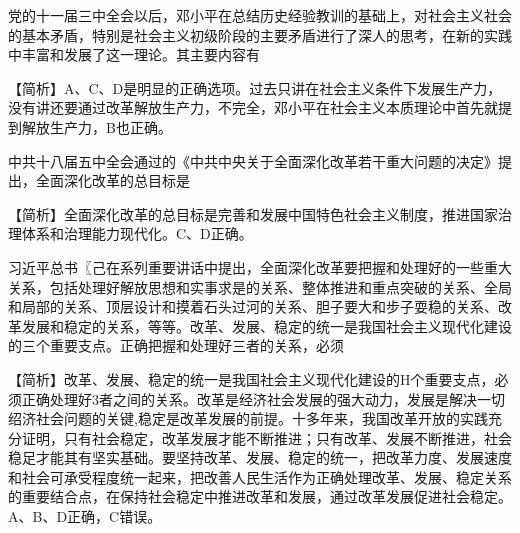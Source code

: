 \question 党的十一届三中全会以后，邓小平在总结历史经验教训的基础上，对社会主义社会的基本矛盾，特别是社会主义初级阶段的主要矛盾进行了深人的思考，在新的实践中丰富和发展了这一理论。其主要内容有
\par\fourch{\textcolor{red}{判断一种生产关系和生产力是否相适应，主要希它是否适应当时当地生产力的耍求，能否推动生产力发展}}{\textcolor{red}{提出在社会主义社会依然有解放生产力的问题}}{\textcolor{red}{社会主义社会基本矛盾、主要矛盾和根本任务是统一的，它们要求必须把经济建设作为党和国家的工作重心，不断解放和发展生产力}}{\textcolor{red}{改革是社会主义制度下解放和发展生产力的必由之路}}
\begin{solution}【简析】A、C、D是明显的正确选项。过去只讲在社会主义条件下发展生产力，没有讲还要通过改革解放生产力，不完全，邓小平在社会主义本质理论中首先就提到解放生产力，B也正确。
\end{solution}
\question 中共十八届五中全会通过的《中共中央关于全面深化改革若干重大问题的决定》提出，全面深化改革的总目标是
\par{}
\begin{solution}【简析】全面深化改革的总目标是完善和发展中国特色社会主义制度，推进国家治理体系和治理能力现代化。C、D正确。
\end{solution}
\question 习近平总书〖己在系列重要讲话中提出，全面深化改革要把握和处理好的一些重大关系，包括处理好解放思想和实事求是的关系、整体推进和重点突破的关系、全局和局部的关系、顶层设计和摸着石头过河的关系、胆子要大和步子耍稳的关系、改革发展和稳定的关系，等等。改革、发展、稳定的统一是我国社会主义现代化建设的三个重要支点。正确把握和处理好三者的关系，必须
\par{}
\begin{solution}【简析】改革、发展、稳定的统一是我国社会主义现代化建设的H个重要支点，必须正确处理好3者之间的关系。改革是经济社会发展的强大动力，发展是解决一切绍济社会问题的关键,稳定是改革发展的前提。十多年来，我国改革开放的实践充分证明，只有社会稳定，改革发展才能不断推进；只有改革、发展不断推进，社会稳足才能其有坚实基础。要坚持改革、发展、稳定的统一，把改革力度、发展速度和社会可承受程度统一起来，把改善人民生活作为正确处理改革、发展、稳定关系的重要结合点，在保持社会稳定中推进改革和发展，通过改革发展促进社会稳定。A、B、D正确，C错误。
\end{solution}
